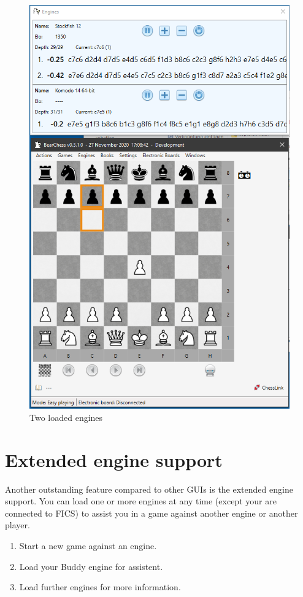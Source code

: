 \documentclass[11pt,a4paper]{article}
\begin{document}
\begin{figure}[H]
	\centering
	\includegraphics[scale=0.7]{EngineWindow2.png}
	\caption{Two loaded engines}
	\label{fig:EngineWindow2}
\end{figure}

\section{Extended engine support}  \label{ExtendedSupport}

Another outstanding feature compared to other GUIs is the extended engine support. You can load one or more engines at any time (except your are connected to FICS) to assist you in a game against another engine or another player.
\begin{enumerate}
	\item Start a new game against an engine.
	\item Load your Buddy engine for assistent.
	\item Load further engines for more information.
\end{enumerate}
\end{document}
